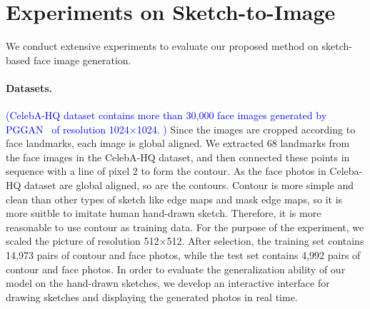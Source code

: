 \documentclass[10pt,twocolumn,letterpaper]{article}
\newcommand{\nt}[1]{\textcolor{blue}{(#1)}}
\begin{document}
\section{Experiments on Sketch-to-Image}
We conduct extensive experiments to evaluate our proposed method on sketch-based face image generation.



\paragraph{Datasets.}
\nt{CelebA-HQ dataset contains more than 30,000 face images generated by PGGAN~\cite{pggan} of resolution 1024×1024. } Since the images are cropped according to face landmarks, each image is global aligned.
We extracted 68 landmarks from the face images in the CelebA-HQ dataset, and then connected these points in sequence with a line of pixel 2 to form the contour. As the face photos in Celeba-HQ dataset are global aligned, so are the contours. Contour is more simple and clean than other types of sketch like edge maps\cite{csagan} and mask edge maps\cite{maskgan}, so it is more suitble to imitate human hand-drawn sketch. Therefore, it is more reasonable to use contour as training data.
For the purpose of the experiment, we scaled the picture of resolution 512×512. After selection, the training set contains 14,973 pairs of contour and face photos, while the test set contains 4,992 pairs of contour and face photos. 
In order to evaluate the generalization ability of our model on the hand-drawn sketches, we develop an interactive interface for drawing sketches and displaying the generated photos in real time.
\end{document}
